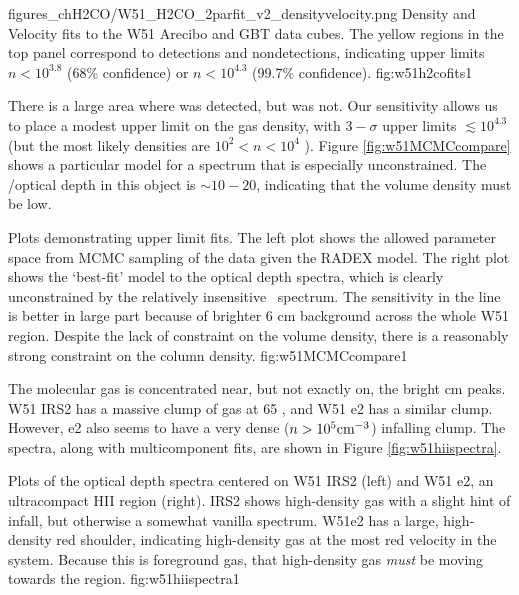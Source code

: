 {figures_chH2CO/W51_H2CO_2parfit_v2_densityvelocity.png}
{Density and Velocity fits to the W51 Arecibo and GBT \formaldehyde 
data cubes.  The yellow regions in the top panel correspond to \oneone
detections and \twotwo nondetections, indicating upper limits $n<10^{3.8}$
(68\% confidence) or $n<10^{4.3}$ (99.7\% confidence).}
{fig:w51h2cofits}{1}

There is a large area where \oneone was detected, but \twotwo was not.  Our
sensitivity allows us to place a modest upper limit on the gas density, with
$3-\sigma$ upper limits $\lesssim10^{4.3}$ \percc (but the most likely
densities are $10^2 < n < 10^4$ \percc).  Figure \ref{fig:w51MCMCcompare} shows
a particular model for a spectrum that is especially unconstrained.  The
\oneone/\twotwo optical depth in this object is $\sim10-20$, indicating that
the volume density must be low.

{Plots demonstrating upper limit fits.  The left plot shows the allowed
parameter space from MCMC sampling of the data given the RADEX model.  The
right plot shows the `best-fit' model to the optical depth spectra, which is
clearly unconstrained by the relatively insensitive \twotwo\ spectrum.  The
sensitivity in the \oneone line is better in large part because of brighter 6
cm background across the whole W51 region.  Despite the lack of constraint on the
volume density, there is a reasonably strong constraint on the column density.}
{fig:w51MCMCcompare}{1}

The molecular gas is concentrated near, but not exactly on, the bright cm
peaks.  W51 IRS2 has a massive clump of gas at 65 \kms, and W51 e2 has a
similar clump.  However, e2 also seems to have a very dense ($n>10^5 \textrm{cm}^{-3}$)
infalling clump.  The spectra, along with multicomponent fits, are shown in
Figure \ref{fig:w51hiispectra}.

{Plots of the optical depth spectra centered on W51 IRS2 (left) and W51 e2, an
ultracompact HII region (right).  IRS2 shows high-density gas with a slight
hint of infall, but otherwise a somewhat vanilla spectrum.  W51e2 has a large,
high-density red shoulder, indicating high-density gas at the most red velocity
in the system.  Because this is foreground gas, that high-density gas
\emph{must} be moving towards the \uchii region.}
{fig:w51hiispectra}{1}




